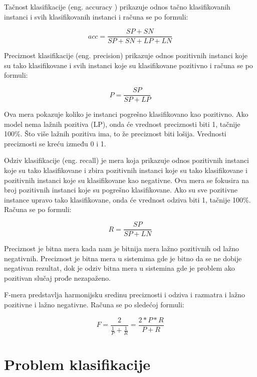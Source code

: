 \documentclass[12pt,oneside]{memoir}
\begin{document}
Tačnost klasifikacije (eng.  accuracy ) prikazuje odnos tačno klasifikovanih instanci i svih klasifikovanih instanci i računa se po formuli:

\begin{equation}
	acc = \frac{SP+SN}{SP+SN+LP+LN}
\end{equation}

Preciznost klasifikacije (eng. precision) prikazuje odnos pozitivnih instanci koje su tako klasifikovane i svih instanci koje su klasifikovane pozitivno i računa se po formuli:

\begin{equation}
	P = \frac{SP}{SP+LP}
\end{equation}

Ova mera pokazuje koliko je instanci pogrešno klasifikovano kao pozitivno.  Ako model nema lažnih pozitiva (LP),  onda će vrednost preciznosti biti 1, tačnije 100\%. Što više lažnih pozitiva ima, to že preciznost biti lošija. Vrednosti preciznosti se kreću između 0 i 1. 

Odziv klasifikacije (eng. recall) je mera koja prikazuje odnos pozitivnih instanci koje su tako klasifikovane i zbira pozitivnih instanci koje su tako klasifikovane i pozitivnih instanci koje su klasifikovane kao negativne.  Ova mera se fokusira na broj pozitivnih instanci koje su pogrešno klasifikovane. Ako su sve pozitivne instance upravo tako klasifikovane,  onda će vrednost odziva biti 1, tačnije 100\%. Računa se po formuli:

\begin{equation}
	R = \frac{SP}{SP+LN}
\end{equation}

Preciznost je bitna mera kada nam je bitnija mera lažno pozitivnih od lažno negativnih.  Preciznost je bitna mera u sistemima gde je bitno da se ne dobije negativan rezultat, dok je odziv bitna mera u sistemina gde je problem ako pozitivan slučaj prođe nezapaženo. 

F-mera predstavlja harmonijsku sredinu preciznosti i odziva i razmatra i lažno pozitivne i lažno negativne.  Računa se po sledećoj formuli:

\begin{equation}
	F = \frac{2}{\frac{1}{P} + \frac{1}{R}} = \frac{2 * P * R }{P + R}
\end{equation}

\chapter{Problem klasifikacije}
\end{document}

